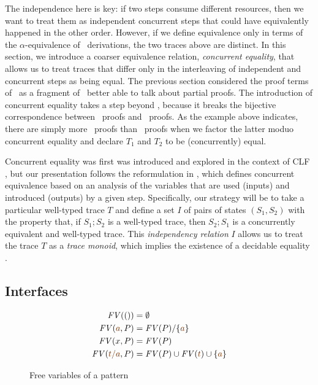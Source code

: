 The independence here is key: if two steps consume different
resources, then we want to treat them as independent concurrent steps
that could have equivalently happened in the other order. However, if
we define equivalence only in terms of the $\alpha$-equivalence of
\ollll~derivations, the two traces above are distinct. In this
section, we introduce a coarser equivalence relation, {\it concurrent
  equality}, that allows us to treat traces that differ only in the
interleaving of independent and concurrent steps as being equal.  The
previous section considered the proof terms of \sls~as a fragment of
\ollll~better able to talk about partial proofs.  The introduction of
concurrent equality takes a step beyond \ollll, because it breaks the
bijective correspondence between \ollll~proofs and \sls~proofs. As the
example above indicates, there are simply more \ollll~proofs than
\sls~proofs when we factor the latter moduo concurrent equality
and declare $T_1$ and $T_2$ to be (concurrently) equal.

Concurrent equality was first was introduced and explored in the
context of CLF \cite{watkins02concurrent}, but our presentation
follows the reformulation in \cite{cervesato12trace}, which defines
concurrent equivalence based on an analysis of the variables that are
used (inputs) and introduced (outputs) by a given step.  Specifically,
our strategy will be to take a particular well-typed trace $T$ and
define a set $I$ of pairs of states $(S_1, S_2)$ with the property
that, if $S_1; S_2$ is a well-typed trace, then $S_2; S_1$ is a
concurrently equivalent and well-typed trace.  This {\it independency
  relation} $I$ allows us to treat the trace $T$ as a {\it trace
  monoid}, which implies the existence of a decidable equality
\cite{diekert90combinatorics}.

\subsection{Interfaces}

\begin{figure}
\begin{align*}
{\it FV}(()) & = \emptyset
\\
{\it FV}(\lf{a}, P) & = {\it FV}(P)/\{\lf{a}\} 
\\
{\it FV}(x, P) & = {\it FV}(P)
\\
{\it FV}(\lf{t/a}, P) & =  {\it FV}(P) \cup {\it FV}(\lf{t}) \cup \{ \lf{a} \}
\end{align*}
\caption{Free variables of a pattern}
\label{fig:freevarspat}
\end{figure}

